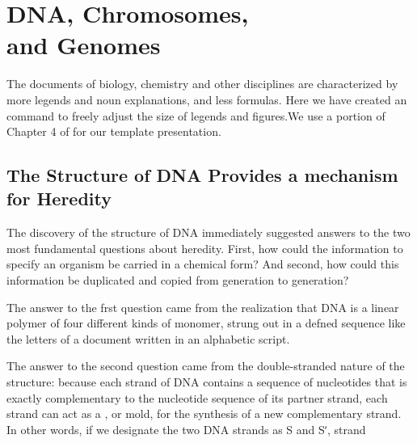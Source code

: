 \chapter[DNA, Chromosomes, and Genomes]{DNA, Chromosomes, \protect\\and Genomes}
The documents of biology, chemistry and other disciplines are characterized by more legends and noun explanations, and less formulas. Here we have created an command  to freely adjust the size of legends and figures.We use a portion of Chapter 4 of 
 for our template presentation.



\section{The Structure of DNA Provides a mechanism for Heredity}

The discovery of the structure of DNA immediately suggested answers to the two
most fundamental questions about heredity. First, how could the information to
specify an organism be carried in a chemical form? And second, how could this
information be duplicated and copied from generation to generation?

The answer to the frst question came from the realization that DNA is a linear
polymer of four diﬀerent kinds of monomer, strung out in a defned sequence like
the letters of a document written in an alphabetic script.

The answer to the second question came from the double-stranded nature of
the structure: because each strand of DNA contains a sequence of nucleotides
that is exactly complementary to the nucleotide sequence of its partner strand,
each strand can act as a , or mold, for the synthesis of a new complementary strand. In other words, if we designate the two DNA strands as S and Sʹ, strand 

